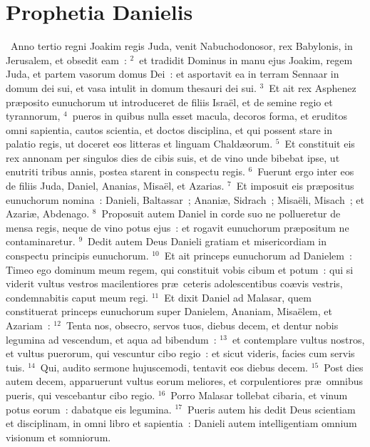 \clearpage
{\centering \section*{Prophetia Danielis}}\thispagestyle{empty}

~Anno tertio regni Joakim regis Juda, venit Nabuchodonosor, rex Babylonis, in Jerusalem, et obsedit eam~:
${}^{2}$~et tradidit Dominus in manu ejus Joakim, regem Juda, et partem vasorum domus Dei~: et asportavit ea in terram Sennaar in domum dei sui, et vasa intulit in domum thesauri dei sui.
${}^{3}$~Et ait rex Asphenez pr\ae posito eunuchorum ut introduceret de filiis Isra\"el, et de semine regio et tyrannorum,
${}^{4}$~pueros in quibus nulla esset macula, decoros forma, et eruditos omni sapientia, cautos scientia, et doctos disciplina, et qui possent stare in palatio regis, ut doceret eos litteras et linguam Chald\ae orum.
${}^{5}$~Et constituit eis rex annonam per singulos dies de cibis suis, et de vino unde bibebat ipse, ut enutriti tribus annis, postea starent in conspectu regis.
${}^{6}$~Fuerunt ergo inter eos de filiis Juda, Daniel, Ananias, Misa\"el, et Azarias.
${}^{7}$~Et imposuit eis pr\ae positus eunuchorum nomina~: Danieli, Baltassar~; Anani\ae , Sidrach~; Misa\"eli, Misach~; et Azari\ae , Abdenago.
${}^{8}$~Proposuit autem Daniel in corde suo ne pollueretur de mensa regis, neque de vino potus ejus~: et rogavit eunuchorum pr\ae positum ne contaminaretur.
${}^{9}$~Dedit autem Deus Danieli gratiam et misericordiam in conspectu principis eunuchorum.
${}^{10}$~Et ait princeps eunuchorum ad Danielem~: Timeo ego dominum meum regem, qui constituit vobis cibum et potum~: qui si viderit vultus vestros macilentiores pr\ae\ ceteris adolescentibus co\ae vis vestris, condemnabitis caput meum regi.
${}^{11}$~Et dixit Daniel ad Malasar, quem constituerat princeps eunuchorum super Danielem, Ananiam, Misa\"elem, et Azariam~:
${}^{12}$~Tenta nos, obsecro, servos tuos, diebus decem, et dentur nobis legumina ad vescendum, et aqua ad bibendum~:
${}^{13}$~et contemplare vultus nostros, et vultus puerorum, qui vescuntur cibo regio~: et sicut videris, facies cum servis tuis.
${}^{14}$~Qui, audito sermone hujuscemodi, tentavit eos diebus decem.
${}^{15}$~Post dies autem decem, apparuerunt vultus eorum meliores, et corpulentiores pr\ae\ omnibus pueris, qui vescebantur cibo regio.
${}^{16}$~Porro Malasar tollebat cibaria, et vinum potus eorum~: dabatque eis legumina.
${}^{17}$~Pueris autem his dedit Deus scientiam et disciplinam, in omni libro et sapientia~: Danieli autem intelligentiam omnium visionum et somniorum.

